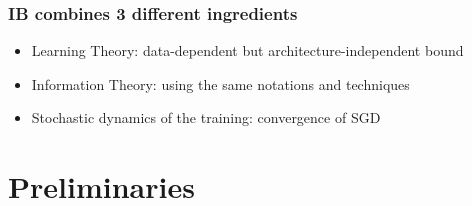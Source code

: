 \documentclass[notes]{beamer}
\begin{document}

\begin{frame}
    \frametitle{IB combines 3 different ingredients}
    \begin{itemize}
        \item Learning Theory: data-dependent but architecture-independent bound 
        \item Information Theory: using the same notations and techniques
        \item Stochastic dynamics of the training: convergence of SGD
    \end{itemize}
\end{frame}


\section{Preliminaries}
\end{document}
